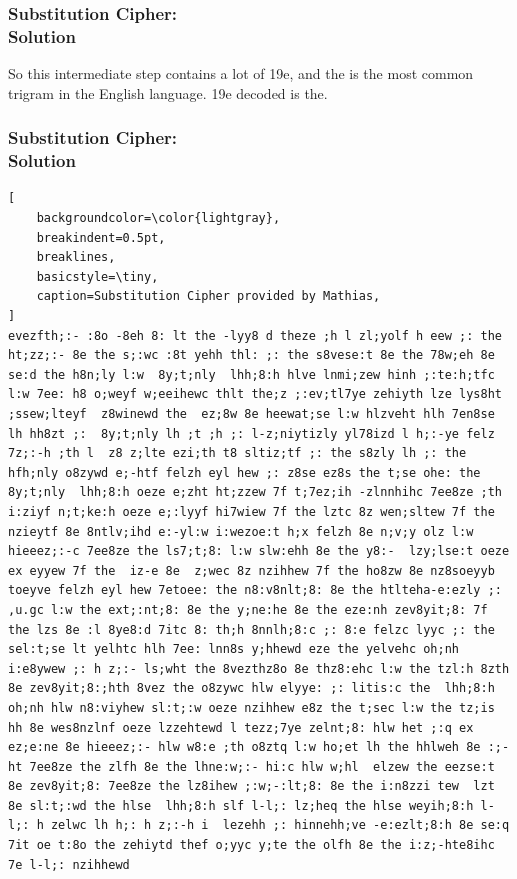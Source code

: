 \documentclass{uva-inf-presentation}
\begin{document}
\begin{frame}
\frametitle{Substitution Cipher:\\ Solution}
So this intermediate step contains a lot of 19e, and the is the most common
trigram in the English language. 19e decoded is the.
\end{frame}

\begin{frame}[containsverbatim]
\frametitle{Substitution Cipher:\\ Solution}
\vspace{-20pt}
\begin{lstlisting}[
    backgroundcolor=\color{lightgray},
    breakindent=0.5pt,
    breaklines,
    basicstyle=\tiny,
    caption=Substitution Cipher provided by Mathias,
]
evezfth;:- :8o -8eh 8: lt the -lyy8 d theze ;h l zl;yolf h eew ;: the ht;zz;:- 8e the s;:wc :8t yehh thl: ;: the s8vese:t 8e the 78w;eh 8e se:d the h8n;ly l:w  8y;t;nly  lhh;8:h hlve lnmi;zew hinh ;:te:h;tfc l:w 7ee: h8 o;weyf w;eeihewc thlt the;z ;:ev;tl7ye zehiyth lze lys8ht ;ssew;lteyf  z8winewd the  ez;8w 8e heewat;se l:w hlzveht hlh 7en8se lh hh8zt ;:  8y;t;nly lh ;t ;h ;: l-z;niytizly yl78izd l h;:-ye felz 7z;:-h ;th l  z8 z;lte ezi;th t8 sltiz;tf ;: the s8zly lh ;: the  hfh;nly o8zywd e;-htf felzh eyl hew ;: z8se ez8s the t;se ohe: the  8y;t;nly  lhh;8:h oeze e;zht ht;zzew 7f t;7ez;ih -zlnnhihc 7ee8ze ;th i:ziyf n;t;ke:h oeze e;:lyyf hi7wiew 7f the lztc 8z wen;sltew 7f the nzieytf 8e 8ntlv;ihd e:-yl:w i:wezoe:t h;x felzh 8e n;v;y olz l:w hieeez;:-c 7ee8ze the ls7;t;8: l:w slw:ehh 8e the y8:-  lzy;lse:t oeze ex eyyew 7f the  iz-e 8e  z;wec 8z nzihhew 7f the ho8zw 8e nz8soeyyb toeyve felzh eyl hew 7etoee: the n8:v8nlt;8: 8e the htlteha-e:ezly ;: ,u.gc l:w the ext;:nt;8: 8e the y;ne:he 8e the eze:nh zev8yit;8: 7f the lzs 8e :l 8ye8:d 7itc 8: th;h 8nnlh;8:c ;: 8:e felzc lyyc ;: the sel:t;se lt yelhtc hlh 7ee: lnn8s y;hhewd eze the yelvehc oh;nh i:e8ywew ;: h z;:- ls;wht the 8vezthz8o 8e thz8:ehc l:w the tzl:h 8zth 8e zev8yit;8:;hth 8vez the o8zywc hlw elyye: ;: litis:c the  lhh;8:h oh;nh hlw n8:viyhew sl:t;:w oeze nzihhew e8z the t;sec l:w the tz;is hh 8e wes8nzlnf oeze lzzehtewd l tezz;7ye zelnt;8: hlw het ;:q ex ez;e:ne 8e hieeez;:- hlw w8:e ;th o8ztq l:w ho;et lh the hhlweh 8e :;-ht 7ee8ze the zlfh 8e the lhne:w;:- hi:c hlw w;hl  elzew the eezse:t 8e zev8yit;8: 7ee8ze the lz8ihew ;:w;-:lt;8: 8e the i:n8zzi tew  lzt 8e sl:t;:wd the hlse  lhh;8:h slf l-l;: lz;heq the hlse weyih;8:h l-l;: h zelwc lh h;: h z;:-h i  lezehh ;: hinnehh;ve -e:ezlt;8:h 8e se:q 7it oe t:8o the zehiytd thef o;yyc y;te the olfh 8e the i:z;-hte8ihc 7e l-l;: nzihhewd
\end{lstlisting}
\end{frame}
\end{document}
